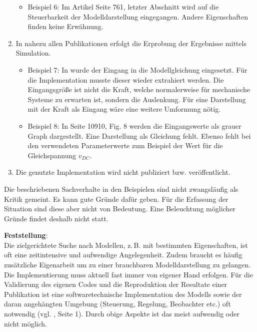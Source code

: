 \begin{enumerate}
	\begin{itemize}[label=$\bullet$]
		\item Beispiel 6: Im Artikel \cite{PEGUEA16} Seite 761, letzter Abschnitt wird auf die Steuerbarkeit der Modelldarstellung eingegangen. Andere Eigenschaften finden keine Erwähnung.
	\end{itemize}
	\item In nahezu allen Publikationen erfolgt die Erprobung der Ergebnisse mittels Simulation. 
	\begin{itemize}[label=$\bullet$]
		\item Beispiel 7: In \cite{BUT21} wurde der Eingang in die Modellgleichung eingesetzt. Für die Implementation musste dieser wieder extrahiert werden. Die Eingangsgröße ist nicht die Kraft, welche normalerweise für mechanische Systeme zu erwarten ist, sondern die Auslenkung. Für eine Darstellung mit der Kraft als Eingang wäre eine weitere Umformung nötig.
		\item Beispiel 8: In \cite{FEGE18} Seite 10910, Fig. 8 werden die Eingangswerte als grauer Graph dargestellt. Eine Darstellung als Gleichung fehlt. Ebenso fehlt bei den verwendeten Parameterwerte zum Beispiel der Wert für die Gleichspannung $v_{DC}$.
	\end{itemize}
	\item Die genutzte Implementation wird nicht publiziert bzw. veröffentlicht.
\end{enumerate}
Die beschriebenen Sachverhalte in den Beispielen sind nicht zwangsläufig als Kritik gemeint. Es kann gute Gründe dafür geben. Für die Erfassung der Situation sind diese aber nicht von Bedeutung. Eine Beleuchtung möglicher Gründe findet deshalb nicht statt.

\textbf{Feststellung}:\\
Die zielgerichtete Suche nach Modellen, z.\,B. mit bestimmten Eigenschaften, ist oft eine zeitintensive und aufwendige Angelegenheit. Zudem braucht es häufig zusätzliche Eigenarbeit um zu einer brauchbaren Modelldarstellung zu gelangen. Die Implementierung muss aktuell fast immer von eigener Hand erfolgen. Für die Validierung des eigenen Codes und die Reproduktion der Resultate einer Publikation ist eine softwaretechnische Implementation des Modells sowie der daran angehängten Umgebung (Steuerung, Regelung, Beobachter etc.) oft notwendig (vgl. \cite{KNHE20b}, Seite 1). Durch obige Aspekte ist das meist aufwendig oder nicht möglich.


